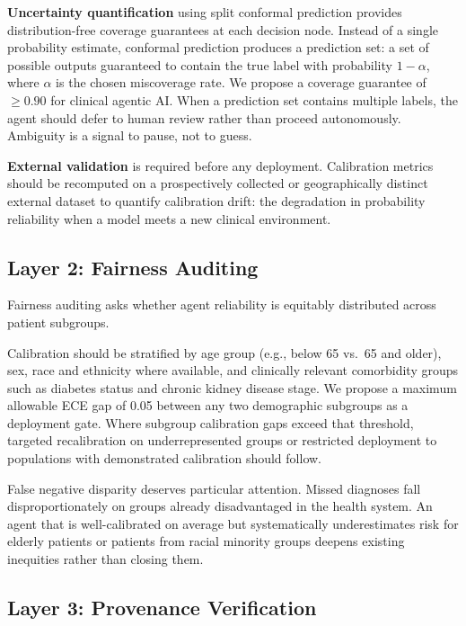 \documentclass[12pt,a4paper]{article}
\begin{document}
\textbf{Uncertainty quantification} using split conformal
prediction\cite{angelopoulos2023} provides distribution-free
coverage guarantees at each decision node. Instead of a single
probability estimate, conformal prediction produces a prediction
set: a set of possible outputs guaranteed to contain the true
label with probability $1-\alpha$, where $\alpha$ is the chosen
miscoverage rate. We propose a coverage guarantee of $\geq 0.90$
for clinical agentic AI. When a prediction set contains multiple
labels, the agent should defer to human review rather than proceed
autonomously. Ambiguity is a signal to pause, not to guess.

\textbf{External validation} is required before any deployment.
Calibration metrics should be recomputed on a prospectively
collected or geographically distinct external dataset to quantify
calibration drift: the degradation in probability reliability
when a model meets a new clinical
environment.\cite{haris2024}

\subsection*{Layer 2: Fairness Auditing}

Fairness auditing asks whether agent reliability is equitably
distributed across patient subgroups.

Calibration should be stratified by age group (e.g., below 65
vs.\ 65 and older), sex, race and ethnicity where available, and
clinically relevant comorbidity groups such as diabetes status
and chronic kidney disease stage. We propose a maximum allowable
ECE gap of 0.05 between any two demographic subgroups as a
deployment gate. Where subgroup calibration gaps exceed that
threshold, targeted recalibration on underrepresented groups or
restricted deployment to populations with demonstrated
calibration should follow.

False negative disparity deserves particular attention. Missed
diagnoses fall disproportionately on groups already
disadvantaged in the health system.\cite{mittelstadt2016}
An agent that is well-calibrated on average but
systematically underestimates risk for elderly patients or
patients from racial minority groups deepens existing inequities
rather than closing them.

\subsection*{Layer 3: Provenance Verification}
\end{document}
